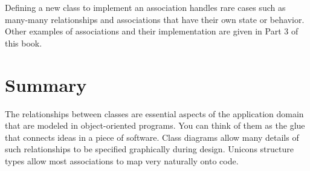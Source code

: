Defining a new class to implement an association handles
rare cases such as many-many relationships and associations that have
their own state or behavior. Other examples of associations and
their implementation are given in Part 3 of this book.

\section*{Summary}

The relationships between classes are essential aspects of the
application domain that are modeled in object-oriented programs. You
can think of them as the {\textquotedbl}glue{\textquotedbl} that
connects ideas in a piece of software. Class diagrams allow many
details of such relationships to be specified graphically during
design. Unicon{\textquotesingle}s structure types allow most
associations to map very naturally onto code.

\clearpage
\bigskip
